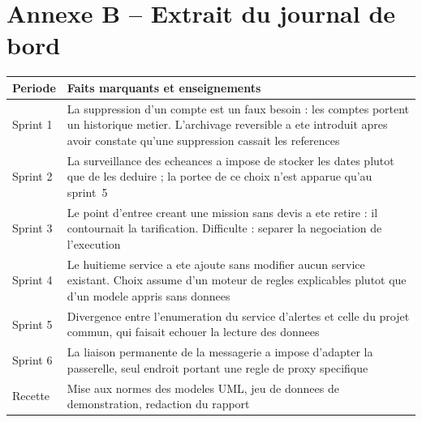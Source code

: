 \section*{Annexe B -- Extrait du journal de bord}

\begin{table}[H]
\centering
\small
\begin{tabularx}{\textwidth}{@{}p{2.3cm}X@{}}
\toprule
\textbf{Periode} & \textbf{Faits marquants et enseignements} \\ \midrule

Sprint 1 & La suppression d'un compte est un faux besoin : les comptes
  portent un historique metier. L'archivage reversible a ete introduit
  apres avoir constate qu'une suppression cassait les references \\

Sprint 2 & La surveillance des echeances a impose de stocker les dates
  plutot que de les deduire ; la portee de ce choix n'est apparue qu'au
  sprint~5 \\

Sprint 3 & Le point d'entree creant une mission sans devis a ete retire :
  il contournait la tarification. Difficulte : separer la negociation de
  l'execution \\

Sprint 4 & Le huitieme service a ete ajoute sans modifier aucun service
  existant. Choix assume d'un moteur de regles explicables plutot que
  d'un modele appris sans donnees \\

Sprint 5 & Divergence entre l'enumeration du service d'alertes et celle
  du projet commun, qui faisait echouer la lecture des donnees \\

Sprint 6 & La liaison permanente de la messagerie a impose d'adapter la
  passerelle, seul endroit portant une regle de proxy specifique \\

Recette & Mise aux normes des modeles UML, jeu de donnees de
  demonstration, redaction du rapport \\

\bottomrule
\end{tabularx}
\end{table}

